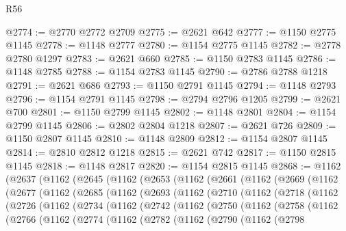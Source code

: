 \begin{lexlean}{R56}
\begin{coremodule}
@2774 := @2770 @2772 @2709
@2775 := @2621 @642
@2777 := @1150 @2775 @1145
@2778 := @1148 @2777
@2780 := @1154 @2775 @1145
@2782 := @2778 @2780 @1297
@2783 := @2621 @660
@2785 := @1150 @2783 @1145
@2786 := @1148 @2785
@2788 := @1154 @2783 @1145
@2790 := @2786 @2788 @1218
@2791 := @2621 @686
@2793 := @1150 @2791 @1145
@2794 := @1148 @2793
@2796 := @1154 @2791 @1145
@2798 := @2794 @2796 @1205
@2799 := @2621 @700
@2801 := @1150 @2799 @1145
@2802 := @1148 @2801
@2804 := @1154 @2799 @1145
@2806 := @2802 @2804 @1218
@2807 := @2621 @726
@2809 := @1150 @2807 @1145
@2810 := @1148 @2809
@2812 := @1154 @2807 @1145
@2814 := @2810 @2812 @1218
@2815 := @2621 @742
@2817 := @1150 @2815 @1145
@2818 := @1148 @2817
@2820 := @1154 @2815 @1145
@2868 := @1162
    (@2637
      (@1162
        (@2645
          (@1162
            (@2653
              (@1162
                (@2661
                  (@1162
                    (@2669
                      (@1162
                        (@2677
                          (@1162
                            (@2685
                              (@1162
                                (@2693
                                  (@1162
                                    (@2710
                                      (@1162
                                        (@2718
                                          (@1162
                                            (@2726
                                              (@1162
                                                (@2734
                                                  (@1162
                                                    (@2742
                                                      (@1162
                                                        (@2750
                                                          (@1162
                                                            (@2758
                                                              (@1162
                                                                (@2766
                                                                  (@1162
                                                                    (@2774
                                                                      (@1162
                                                                        (@2782
                                                                          (@1162
                                                                            (@2790
                                                                              (@1162
                                                                                (@2798

\end{coremodule}
\end{lexlean}
